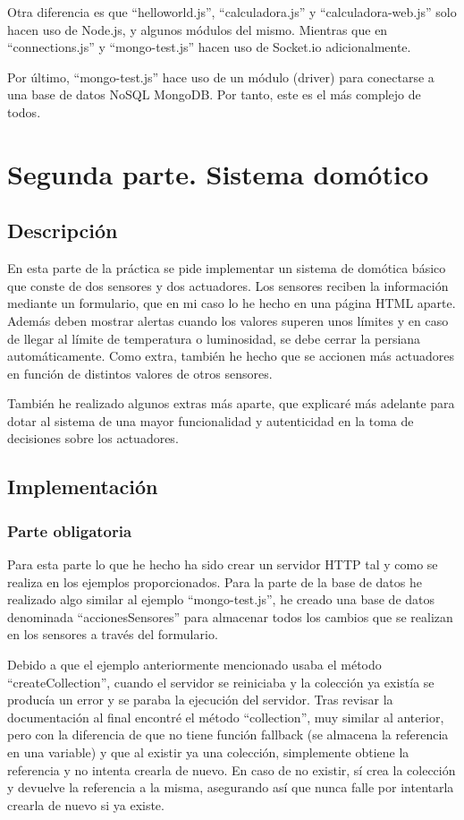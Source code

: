 \documentclass{article}
\begin{document}
\bigskip

Otra diferencia es que ``helloworld.js'', ``calculadora.js'' y ``calculadora-web.js'' solo hacen uso de Node.js, y algunos módulos del mismo. Mientras que en ``connections.js'' y ``mongo-test.js'' hacen uso de Socket.io adicionalmente.

\bigskip

Por último, ``mongo-test.js'' hace uso de un módulo (driver) para conectarse a una base de datos NoSQL MongoDB. Por tanto, este es el más complejo de todos.

\section{Segunda parte. Sistema domótico}
\subsection{Descripción}
En esta parte de la práctica se pide implementar un sistema de domótica básico que conste de dos sensores y dos actuadores. Los sensores reciben la información mediante un formulario, que en mi caso lo he hecho en una página HTML aparte. Además deben mostrar alertas cuando los valores superen unos límites y en caso de llegar al límite de temperatura o luminosidad, se debe cerrar la persiana automáticamente. Como extra, también he hecho que se accionen más actuadores en función de distintos valores de otros sensores.

También he realizado algunos extras más aparte, que explicaré más adelante para dotar al sistema de una mayor funcionalidad y autenticidad en la toma de decisiones sobre los actuadores.

\subsection{Implementación}
\subsubsection{Parte obligatoria}
Para esta parte lo que he hecho ha sido crear un servidor HTTP tal y como se realiza en los ejemplos proporcionados. Para la parte de la base de datos he realizado algo similar al ejemplo ``mongo-test.js'', he creado una base de datos denominada ``accionesSensores'' para almacenar todos los cambios que se realizan en los sensores a través del formulario.

\bigskip

Debido a que el ejemplo anteriormente mencionado usaba el método ``createCollection'', cuando el servidor se reiniciaba y la colección ya existía se producía un error y se paraba la ejecución del servidor. Tras revisar la documentación al final encontré el método ``collection'', muy similar al anterior, pero con la diferencia de que no tiene función fallback (se almacena la referencia en una variable) y que al existir ya una colección, simplemente obtiene la referencia y no intenta crearla de nuevo. En caso de no existir, sí crea la colección y devuelve la referencia a la misma, asegurando así que nunca falle por intentarla crearla de nuevo si ya existe.
\end{document}
